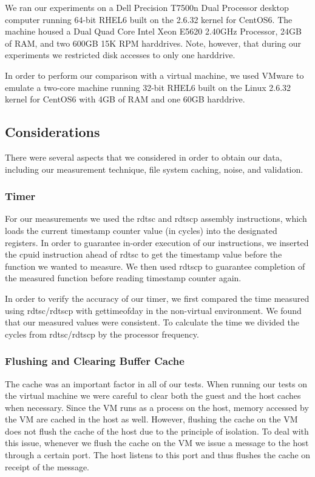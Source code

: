 We ran our experiments on a Dell Precision T7500n Dual Processor desktop 
computer running 64-bit RHEL6 built on the 2.6.32 kernel for CentOS6. The 
machine housed a Dual Quad Core Intel\textsuperscript{\textregistered} 
Xeon\textsuperscript{\textregistered} E5620 2.40GHz Processor, 24GB of RAM, 
and two 600GB 15K RPM harddrives. Note, however, that during our experiments 
we restricted disk accesses to only one harddrive.

In order to perform our comparison with a virtual machine, we used VMware to
emulate a two-core machine running 32-bit RHEL6 built on the Linux 2.6.32 
kernel for CentOS6 with 4GB of RAM and one 60GB harddrive.

\subsection{Considerations}
There were several aspects that we considered in order to obtain our data, 
including our measurement technique, file system caching, noise, and validation.

\subsubsection{Timer}
For our measurements we used the rdtsc and rdtscp assembly instructions, which loads the current timestamp counter value (in cycles) into the designated registers. In order to guarantee in-order execution of our instructions, we inserted the cpuid instruction ahead of rdtsc to get the timestamp value before the function we wanted to measure. We then used rdtscp to guarantee completion of the measured function before reading timestamp counter again.

In order to verify the accuracy of our timer, we first compared the time measured 
using rdtsc/rdtscp with gettimeofday in the non-virtual environment. We found that 
our measured values were consistent. To calculate the time we divided the cycles from rdtsc/rdtscp by the processor frequency.

\subsubsection{Flushing and Clearing Buffer Cache}
The cache was an important factor in all of our tests. When running our tests on the
virtual machine we were careful to clear both the guest and the host caches when 
necessary. Since the VM runs as a process on the host, memory accessed by the VM
are cached in the host as well. However, flushing the cache on the VM does not 
flush the cache of the host due to the principle of isolation. To deal with this 
issue, whenever we flush the cache on the VM we issue a message to the host through
a certain port. The host listens to this port and thus flushes the cache on receipt
of the message.

